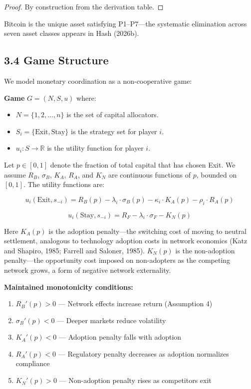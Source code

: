 \documentclass[12pt]{article}
\theoremstyle{definition}
\theoremstyle{remark}
\begin{document}
\begin{proof}
By construction from the derivation table.
\end{proof}

Bitcoin is the unique asset satisfying P1--P7---the systematic
elimination across seven asset classes appears in Hash (2026b).

\subsection{3.4 Game Structure}

We model monetary coordination as a non-cooperative game:

\noindent\textbf{Game} $G = (N, S, u)$ where:

\begin{itemize}[nosep]
\item $N = \{1, 2, \ldots, n\}$ is the set of capital allocators.
\item $S_i = \{\text{Exit}, \text{Stay}\}$ is the strategy set for player $i$.
\item $u_i : S \to \mathbb{R}$ is the utility function for player $i$.
\end{itemize}

Let $p \in [0, 1]$ denote the fraction of total capital that has chosen
Exit. We assume $R_B$, $\sigma_B$, $K_A$, $R_A$, and $K_N$ are continuous
functions of $p$, bounded on $[0,1]$. The utility functions are:

\[
u_i(\text{Exit}, s_{-i}) = R_B(p) - \lambda_i \cdot \sigma_B(p) - \kappa_i \cdot K_A(p) - \rho_i \cdot R_A(p)
\]

\[
u_i(\text{Stay}, s_{-i}) = R_F - \lambda_i \cdot \sigma_F - K_N(p)
\]

Here $K_A(p)$ is the adoption penalty---the switching cost of moving
to neutral settlement, analogous to technology adoption costs in network
economics (Katz and Shapiro, 1985; Farrell and Saloner, 1985).
$K_N(p)$ is the non-adoption penalty---the opportunity cost imposed on
non-adopters as the competing network grows, a form of negative network
externality.

\noindent\textbf{Maintained monotonicity conditions:}

\begin{enumerate}[label=(M\arabic*),nosep]
\item $R_B'(p) > 0$ --- Network effects increase return (Assumption 4)
\item $\sigma_B'(p) < 0$ --- Deeper markets reduce volatility
\item $K_A'(p) < 0$ --- Adoption penalty falls with adoption
\item $R_A'(p) < 0$ --- Regulatory penalty decreases as adoption normalizes compliance
\item $K_N'(p) > 0$ --- Non-adoption penalty rises as competitors exit
\end{enumerate}
\end{document}
